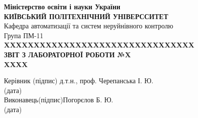 \documentclass[a4paper,14pt]{extarticle}
\begin{document}
\begin{titlepage}
    \centering
    \textbf{Міністерство освіти і науки України}\\
    \textbf{КИЇВСЬКИЙ ПОЛІТЕХНІЧНИЙ УНІВЕРССИТЕТ}\\[5cm]
    \raggedleft
    Кафедра автоматизації та систем неруйнівного контролю\\
    Група ПМ-11\\[1cm]
    \centering
    \textbf{XXXXXXXXXXXXXXXXXXXXXXXXXXXXXXXX}\\[1cm]
    \textbf{ЗВІТ З ЛАБОРАТОРНОЇ РОБОТИ №X}\\[1cm]
    \textbf{XXXX}\\[3cm]
    \begin{flushleft}
        Керівник  \qquad\qquad\quad \hfill\qquad (підпис)\hfill 
        д.т.н., проф. Черепанська І. Ю.\\
        \hfill (дата)\\[2cm]
        Виконавець\hfill (підпис)\hfill Погорєлов Б. Ю.\\
        \hfill (дата)\\[2cm]
    \end{flushleft}
\end{titlepage}
\end{document}
